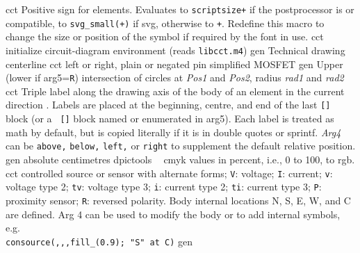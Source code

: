 %
  {cct}%
  {Positive sign for elements. Evaluates to
   {\tt \bsl{}scriptsize+} if the
   postprocessor is \latex or compatible, to {\tt svg\_small(+)} if svg,
   otherwise to {\tt +}.  Redefine this macro to change the size or position
   of the symbol if required by the font in use.}%
%
  {cct}%
  {initialize circuit-diagram environment (reads {\tt libcct.m4})}%
%
  {gen}%
  {Technical drawing centerline}%
%
  {cct}%
  {left or right, plain or negated pin simplified MOSFET}%
%
  {gen}%
  {Upper (lower if arg5={\tt R}) intersection of circles at
    {\sl Pos1} and {\sl Pos2}, radius {\sl rad1} and {\sl rad2}}
%
  {cct}%
  {Triple label along the drawing axis of the body of an element in the
    current direction .  Labels are placed at the
    beginning, centre, and end of the last {\tt []} block (or a {\tt
    []} block named or enumerated in arg5). Each label is treated as
    math by default, but is copied literally if it is in double quotes
    or sprintf.  {\sl Arg4} can be {\tt above,} {\tt below,} {\tt left,}
    or {\tt right} to supplement the default relative position.}%
%
  {gen}%
  {absolute centimetres}%
%
  {dpictools}%
  {$\;\;$ cmyk values in percent, i.e., 0 to 100, to rgb.}%
%
  {cct}%
  {controlled source or sensor with alternate forms;
   {\tt V}: voltage;
   {\tt I}: current;
   {\tt v}: voltage type 2;
   {\tt tv}: voltage type 3;
   {\tt i}: current type 2;
   {\tt ti}: current type 3;
   {\tt P}: proximity sensor;
   {\tt R}: reversed polarity.
  Body internal locations N, S, E, W, and C are defined.
  Arg 4 can be used to modify the body or to add internal symbols, e.g.\\
    {\tt consource(,{,},fill\_(0.9); "S" at C)}}%
%
  {gen}%
